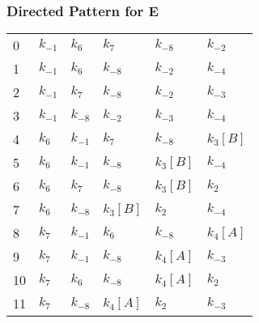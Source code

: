 \documentclass{article}%
\begin{document}
\subsubsection{Directed Pattern for E}%
\label{ssubsec:Directed Pattern for E}%
\begin{tabular}{llllll}
\toprule
0  &  $k_{-1}$ &   $k_{6}$ &       $k_{7}$ &      $k_{-8}$ &      $k_{-2}$ \\
1  &  $k_{-1}$ &   $k_{6}$ &      $k_{-8}$ &      $k_{-2}$ &      $k_{-4}$ \\
2  &  $k_{-1}$ &   $k_{7}$ &      $k_{-8}$ &      $k_{-2}$ &      $k_{-3}$ \\
3  &  $k_{-1}$ &  $k_{-8}$ &      $k_{-2}$ &      $k_{-3}$ &      $k_{-4}$ \\
4  &   $k_{6}$ &  $k_{-1}$ &       $k_{7}$ &      $k_{-8}$ &  $k_{3}$$[B]$ \\
5  &   $k_{6}$ &  $k_{-1}$ &      $k_{-8}$ &  $k_{3}$$[B]$ &      $k_{-4}$ \\
6  &   $k_{6}$ &   $k_{7}$ &      $k_{-8}$ &  $k_{3}$$[B]$ &       $k_{2}$ \\
7  &   $k_{6}$ &  $k_{-8}$ &  $k_{3}$$[B]$ &       $k_{2}$ &      $k_{-4}$ \\
8  &   $k_{7}$ &  $k_{-1}$ &       $k_{6}$ &      $k_{-8}$ &  $k_{4}$$[A]$ \\
9  &   $k_{7}$ &  $k_{-1}$ &      $k_{-8}$ &  $k_{4}$$[A]$ &      $k_{-3}$ \\
10 &   $k_{7}$ &   $k_{6}$ &      $k_{-8}$ &  $k_{4}$$[A]$ &       $k_{2}$ \\
11 &   $k_{7}$ &  $k_{-8}$ &  $k_{4}$$[A]$ &       $k_{2}$ &      $k_{-3}$ \\
\bottomrule
\end{tabular}

%
\end{document}
